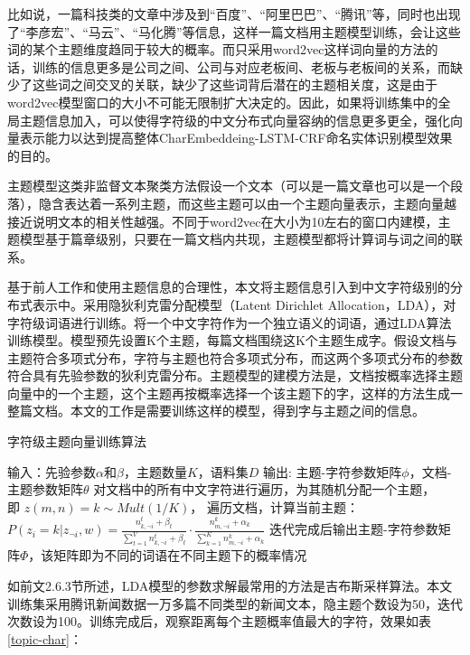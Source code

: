 \documentclass[winfonts,master,oneside,nobackinfo]{njuthesis}
\begin{document}
比如说，一篇科技类的文章中涉及到“百度”、“阿里巴巴”、“腾讯”等，同时也出现了“李彦宏”、“马云”、“马化腾”等信息，这样一篇文档用主题模型训练，会让这些词的某个主题维度趋同于较大的概率。而只采用word2vec这样词向量的方法的话，训练的信息更多是公司之间、公司与对应老板间、老板与老板间的关系，而缺少了这些词之间交叉的关联，缺少了这些词背后潜在的主题相关度，这是由于word2vec模型窗口的大小不可能无限制扩大决定的。因此，如果将训练集中的全局主题信息加入，可以使得字符级的中文分布式向量容纳的信息更多更全，强化向量表示能力以达到提高整体CharEmbeddeing-LSTM-CRF命名实体识别模型效果的目的。

主题模型这类非监督文本聚类方法假设一个文本（可以是一篇文章也可以是一个段落），隐含表达着一系列主题，而这些主题可以由一个主题向量表示，主题向量越接近说明文本的相关性越强。不同于word2vec在大小为10左右的窗口内建模，主题模型基于篇章级别，只要在一篇文档内共现，主题模型都将计算词与词之间的联系。

基于前人工作和使用主题信息的合理性，本文将主题信息引入到中文字符级别的分布式表示中。采用隐狄利克雷分配模型（Latent Dirichlet Allocation，LDA），对字符级词语进行训练。将一个中文字符作为一个独立语义的词语，通过LDA算法训练模型。模型预先设置K个主题，每篇文档围绕这K个主题生成字。假设文档与主题符合多项式分布，字符与主题也符合多项式分布，而这两个多项式分布的参数符合具有先验参数的狄利克雷分布。主题模型的建模方法是，文档按概率选择主题向量中的一个主题，这个主题再按概率选择一个该主题下的字，这样的方法生成一整篇文档。本文的工作是需要训练这样的模型，得到字与主题之间的信息。
\begin{algorithm}[h]
    \caption{字符级主题向量训练算法}
    \label{alg1}
    \begin{algorithmic}[1]
        \STATE 输入：先验参数$\alpha$和$\beta$，主题数量$K$，语料集$D$
        \STATE 输出: 主题-字符参数矩阵$\phi$，文档-主题参数矩阵$\theta$
        \STATE 对文档中的所有中文字符进行遍历，为其随机分配一个主题，\\即 $z(m,n)=k \sim Mult(1/K )$，  
        \STATE 遍历文档，计算当前主题：\\
        $P(z_i=k|z_{\neg i}, w) = \frac {n_{k, \neg i}^t + \beta_t} { \sum_{t=1}^{V} n_{k,\neg i}^t + \beta_t} \cdot \frac {n_{m,\neg i}^k + \alpha_k} {\sum_{k=1}^{K} n_{m, \neg i}^k + \alpha_k }$
        \STATE 迭代完成后输出主题-字符参数矩阵$\Phi$，该矩阵即为不同的词语在不同主题下的概率情况
    \end{algorithmic}
\end{algorithm}

如前文2.6.3节所述，LDA模型的参数求解最常用的方法是吉布斯采样算法。本文训练集采用腾讯新闻数据一万多篇不同类型的新闻文本，隐主题个数设为50，迭代次数设为100。训练完成后，观察距离每个主题概率值最大的字符，效果如表\ref{topic-char}：
\end{document}
